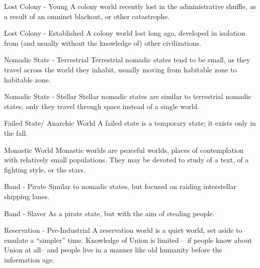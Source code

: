              Lost Colony - Young                  A colony world recently lost in the administrative
                                                  shuffle, as a result of an omninet blackout, or other
                                                  catastrophe.

             Lost Colony - Established            A colony world lost long ago, developed in isolation
                                                  from (and usually without the knowledge of) other
                                                  civilizations.

             Nomadic State - Terrestrial          Terrestrial nomadic states tend to be small, as they
                                                  travel across the world they inhabit, usually moving
                                                  from habitable zone to habitable zone.

             Nomadic State - Stellar              Stellar nomadic states are similar to terrestrial
                                                  nomadic states, only they travel through space
                                                  instead of a single world.

             Failed State/ Anarchic World         A failed state is a temporary state; it exists only in the
                                                  fall.

             Monastic World                       Monastic worlds are peaceful worlds, places of
                                                  contemplation with relatively small populations. They
                                                  may be devoted to study of a text, of a fighting style,
                                                  or the stars.

             Band - Pirate                        Similar to nomadic states, but focused on raiding
                                                  interstellar shipping lanes.

             Band  - Slaver                       As a pirate state, but with the aim of stealing people.

             Reservation -  Pre-Industrial        A reservation world is a quiet world, set aside to
                                                  emulate a “simpler” time. Knowledge of Union is
                                                  limited -- if people know about Union at all--  and
                                                  people live in a manner like old humanity before the
                                                  information age.

